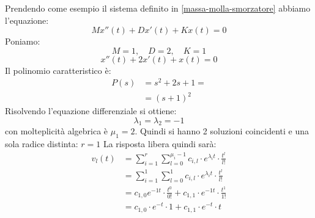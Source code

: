 \documentclass[a4paper]{article}
\begin{document}
\begin{example}
  Prendendo come esempio il sistema definito in \ref{massa-molla-smorzatore} abbiamo l'equazione:
  \[
  Mx''(t) + Dx'(t) + Kx(t) = 0
  \] 
  Poniamo:
  \[
    M=1, \quad D=2, \quad K=1
  \] 
  \[
  x''(t) + 2x'(t) + x(t) = 0
  \] 
  Il polinomio caratteristico è:
  \[
    \begin{aligned}
      P(s) &= s^2 + 2s + 1 =\\
           &= (s+1)^2 
    \end{aligned}
  \] 
  Risolvendo l'equazione differenziale si ottiene:
  \[
  \lambda_1 = \lambda_2 = -1
  \] 
  con molteplicità algebrica è \( \mu_1 = 2 \). Quindi si hanno 2 soluzioni coincidenti
  e una sola radice distinta: $r = 1$ La risposta libera quindi sarà:
  \[
    \begin{aligned}
      v_l(t) &= \sum_{i=1}^{r} \sum_{l=0}^{\mu_i-1} c_{i,l} \cdot  e^{\lambda_i t} \cdot \frac{t^l}{l!} \\
             &= \sum_{i=1}^{1} \sum_{l=0}^{1} c_{i,l} \cdot  e^{\lambda_i t} \cdot \frac{t^l}{l!} \\
             &= c_{1,0} e^{-1t} \cdot \frac{t^0}{0!} + c_{1,1} \cdot e^{-1t} \cdot \frac{t^1}{1!} \\
             &= c_{1,0} \cdot e^{-t} \cdot 1 + c_{1,1} \cdot e^{-t} \cdot t
    \end{aligned}
  \] 
\end{example}
\end{document}
